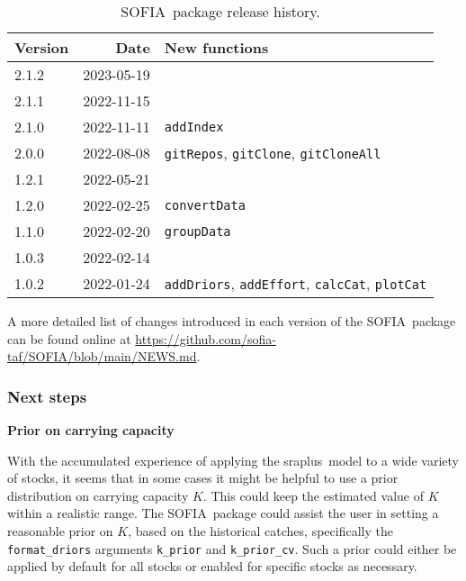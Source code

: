 \documentclass[12pt]{article}
\newcommand\blue[1]{\textcolor{darkblue}{#1}}
\newcommand\I[1]{\rule{0pt}{#1}}
\newcommand\SOFIA{{\sf SOFIA}}
\newcommand\sraplus{{\sf sraplus}}
\begin{document}
\begin{table}[htb]\small
  \caption{\SOFIA\ package release history.}
  \centering
  \begin{tabular}{lrl}
    \hline
    Version & Date & New functions\\
    \hline
    2.1.2   & 2023-05-19 & ~\I{2.3ex}\\
    2.1.1   & 2022-11-15 & ~\\
    2.1.0   & 2022-11-11 & \verb|addIndex|\\[0.5ex]
    2.0.0   & 2022-08-08 & \verb|gitRepos|, \verb|gitClone|,
                           \verb|gitCloneAll|\\[0.5ex]
    1.2.1   & 2022-05-21 & ~\\
    1.2.0   & 2022-02-25 & \verb|convertData|\\[0.5ex]
    1.1.0   & 2022-02-20 & \verb|groupData|\\[0.5ex]
    1.0.3   & 2022-02-14 & ~\\
    1.0.2   & 2022-01-24 & \verb|addDriors|, \verb|addEffort|, \verb|calcCat|,
                           \verb|plotCat|\\
    \hline
  \end{tabular}
  \label{tab:package-history}
  \vspace{1.5ex}
\end{table}

A more detailed list of changes introduced in each version of the \SOFIA\
package can be found online at
\blue{\url{https://github.com/sofia-taf/SOFIA/blob/main/NEWS.md}}.

\subsubsection{Next steps}

\textbf{Prior on carrying capacity}

With the accumulated experience of applying the \sraplus\ model to a wide
variety of stocks, it seems that in some cases it might be helpful to use a
prior distribution on carrying capacity $K$. This could keep the estimated value
of $K$ within a realistic range. The \SOFIA\ package could assist the user in
setting a reasonable prior on $K$, based on the historical catches, specifically
the \verb|format_driors| arguments \verb|k_prior| and \verb|k_prior_cv|. Such a
prior could either be applied by default for all stocks or enabled for specific
stocks as necessary.\\[-2ex]
\end{document}
